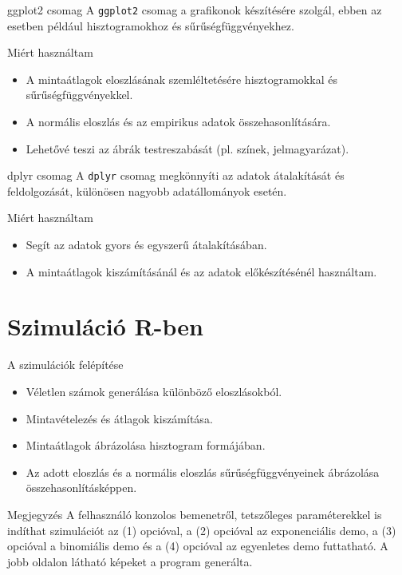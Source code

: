 \documentclass[aspectratio=169,12pt]{beamer}
\begin{document}
	\begin{frame}{ggplot2 csomag}
		A \texttt{ggplot2} csomag a grafikonok készítésére szolgál, ebben az esetben például hisztogramokhoz és sűrűségfüggvényekhez.
		\vfill
		\begin{block}{Miért használtam}
			\begin{itemize}
				\item A mintaátlagok eloszlásának szemléltetésére hisztogramokkal és sűrűségfüggvényekkel.
				\item A normális eloszlás és az empirikus adatok összehasonlítására.
				\item Lehetővé teszi az ábrák testreszabását (pl. színek, jelmagyarázat).
			\end{itemize}
		\end{block}
	\end{frame}
	
	\begin{frame}{dplyr csomag}
		A \texttt{dplyr} csomag megkönnyíti az adatok átalakítását és feldolgozását, különösen nagyobb adatállományok esetén.
		\vfill
		\begin{block}{Miért használtam}
			\begin{itemize}
				\item Segít az adatok gyors és egyszerű átalakításában.
				\item A mintaátlagok kiszámításánál és az adatok előkészítésénél használtam.
			\end{itemize}
		\end{block}
	\end{frame}
	
	\section{Szimuláció R-ben}
	\begin{frame}{A szimulációk felépítése}
		\begin{itemize}
			\item Véletlen számok generálása különböző eloszlásokból.
			\item Mintavételezés és átlagok kiszámítása.
			\item Mintaátlagok ábrázolása hisztogram formájában.
			\item Az adott eloszlás és a normális eloszlás sűrűségfüggvényeinek ábrázolása összehasonlításképpen.
		\end{itemize}
		\begin{block}{Megjegyzés}
			A felhasználó konzolos bemenetről, tetszőleges paraméterekkel is indíthat szimulációt az (1) opcióval, a (2) opcióval az exponenciális demo, a (3) opcióval a binomiális demo és a (4) opcióval az egyenletes demo futtatható. A jobb oldalon látható képeket a program generálta.
		\end{block}
	\end{frame}
	
\end{document}
